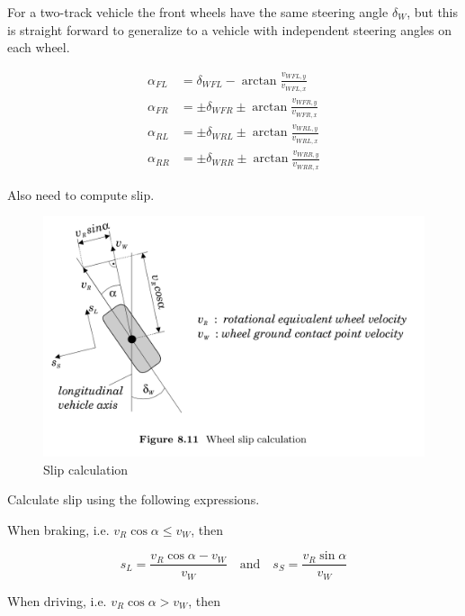 For a two-track vehicle the front wheels have the same steering angle $\delta_W$, but this is straight forward to generalize to a vehicle with independent steering angles on each wheel.

\begin{align*}
    \alpha_{FL} &= \delta_{WFL} - \arctan{\frac{v_{WFL,y}}{v_{WFL,x}}} \\
    \alpha_{FR} &= \pm \delta_{WFR} \pm  \arctan{\frac{v_{WFR,y}}{v_{WFR,x}}} \\
    \alpha_{RL} &= \pm \delta_{WRL} \pm \arctan{\frac{v_{WRL,y}}{v_{WRL,x}}} \\
    \alpha_{RR} &= \pm \delta_{WRR} \pm \arctan{\frac{v_{WRR,y}}{v_{WRR,x}}}
\end{align*}


Also need to compute slip.

\begin{figure}
    \centering
    \includegraphics[width=\textwidth]{draft/stolen-figures/wheel-slip-calculation.png}
    \caption{Slip calculation}
    \label{fig:wheel-sideslip-calculation}
\end{figure}

Calculate slip using the following expressions.

When braking, i.e. $v_R \cos{\alpha} \leq v_W$, then 

\begin{equation}
  s_L = \frac{v_R \cos{\alpha} - v_W}{v_W}
  \quad \text{and} \quad
  s_S = \frac{v_R \sin{\alpha}}{v_W}
\end{equation}

When driving, i.e. $v_R \cos{\alpha} > v_W$, then 

